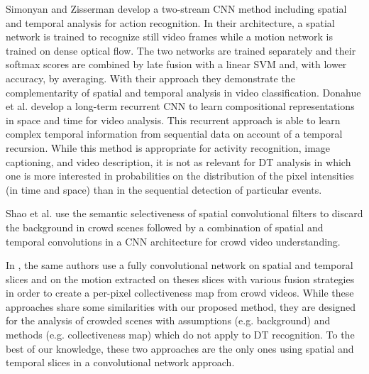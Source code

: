 \documentclass[a4paper,11pt]{article}
\begin{document}
Simonyan and Zisserman \cite{simonyan2014two} develop a two-stream CNN method including spatial and temporal analysis for action recognition.
In their architecture, a spatial network is trained to recognize still video frames while a motion network is trained on dense optical flow.
The two networks are trained separately and their softmax scores are combined by late fusion with a linear SVM and, with lower accuracy, by averaging. With their approach they demonstrate the complementarity of spatial and temporal analysis in video classification.
Donahue et al. \cite{donahue2015long} develop a long-term recurrent CNN to learn compositional representations in space and time for video analysis.
This recurrent approach is able to learn complex temporal information from sequential data on account of a temporal recursion.
While this method is appropriate for activity recognition, image captioning, and video description, it is not as relevant for DT analysis in which one is more interested in probabilities on the distribution of
the pixel intensities (in time and space) than in the sequential detection of particular events.

Shao et al. \cite{shao2016slicing} use the semantic selectiveness of spatial convolutional filters to discard the background in crowd scenes followed by a combination of
spatial and temporal convolutions in a CNN architecture for crowd video understanding.

In \cite{shaocrowded}, the same authors use a fully convolutional network on spatial and temporal slices and on the motion extracted on theses slices
with various fusion strategies in order to create a per-pixel collectiveness map from crowd videos. 
While these approaches share some similarities with our proposed method, they are designed for the analysis of crowded scenes
with assumptions (e.g. background) and methods (e.g. collectiveness map) which do not apply to DT recognition.
To the best of our knowledge, these two approaches are the only ones using spatial and temporal slices in a convolutional network approach.
\end{document}
